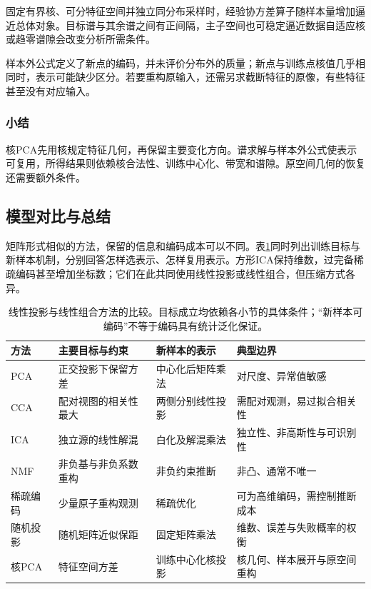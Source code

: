 固定有界核、可分特征空间并独立同分布采样时，经验协方差算子随样本量增加逼近总体对象。目标谱与其余谱之间有正间隔，主子空间也可稳定逼近数据自适应核或趋零谱隙会改变分析所需条件。

样本外公式定义了新点的编码，并未评价分布外的质量；新点与训练点核值几乎相同时，表示可能缺少区分。若要重构原输入，还需另求截断特征的原像，有些特征甚至没有对应输入。

\subsubsection{小结}

核PCA先用核规定特征几何，再保留主要变化方向。谱求解与样本外公式使表示可复用，所得结果则依赖核合法性、训练中心化、带宽和谱隙。原空间几何的恢复还需要额外条件。

\subsection{模型对比与总结}
\label{sec:dim-linear-comparison}

矩阵形式相似的方法，保留的信息和编码成本可以不同。表\ref{tab:dim-linear-comparison}同时列出训练目标与新样本机制，分别回答怎样选表示、怎样复用表示。方形ICA保持维数，过完备稀疏编码甚至增加坐标数；它们在此共同使用线性投影或线性组合，但压缩方式各异。

\begin{table}[htbp]
  \centering
  \small
  \begin{tabularx}{\linewidth}{@{}l>{\RaggedRight\arraybackslash}X>{\RaggedRight\arraybackslash}X>{\RaggedRight\arraybackslash}X@{}}
    \toprule
    方法 & 主要目标与约束 & 新样本的表示 & 典型边界\\
    \midrule
    PCA & 正交投影下保留方差 & 中心化后矩阵乘法 & 对尺度、异常值敏感\\
    CCA & 配对视图的相关性最大 & 两侧分别线性投影 & 需配对观测，易过拟合相关性\\
    ICA & 独立源的线性解混 & 白化及解混乘法 & 独立性、非高斯性与可识别性\\
    NMF & 非负基与非负系数重构 & 非负约束推断 & 非凸、通常不唯一\\
    稀疏编码 & 少量原子重构观测 & 稀疏优化 & 可为高维编码，需控制推断成本\\
    随机投影 & 随机矩阵近似保距 & 固定矩阵乘法 & 维数、误差与失败概率的权衡\\
    核PCA & 特征空间方差 & 训练中心化核投影 & 核几何、样本展开与原空间重构\\
    \bottomrule
  \end{tabularx}
  \caption{线性投影与线性组合方法的比较。目标成立均依赖各小节的具体条件；“新样本可编码”不等于编码具有统计泛化保证。}
  \label{tab:dim-linear-comparison}
\end{table}

